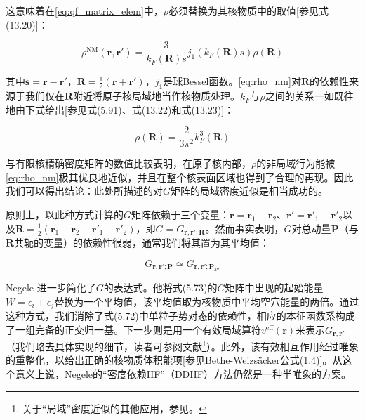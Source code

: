 这意味着在\ref{eq:qf_matrix_elem}中，$\rho$必须替换为其核物质中的取值{[}参见式(13.20){]}：

\begin{equation}
\rho^{\mathrm{NM}}(\boldsymbol{r},\boldsymbol{r}')=\frac{3}{k_{F}(\boldsymbol{R})s}j_{1}(k_{F}(\boldsymbol{R})s)\rho(\boldsymbol{R})\label{eq:rho_nm}
\end{equation}

其中$\boldsymbol{s}=\boldsymbol{r}-\boldsymbol{r}'$，$\boldsymbol{R}=\frac{1}{2}(\boldsymbol{r}+\boldsymbol{r}')$，$j_{1}$是球Bessel函数。\ref{eq:rho_nm}对$\boldsymbol{R}$的依赖性来源于我们仅在$\boldsymbol{R}$附近将原子核局域地当作核物质处理。$k_{F}$与$\rho$之间的关系一如既往地由下式给出{[}参见式(5.91)、式(13.22)和式(13.23){]}：

\begin{equation}
\rho(\boldsymbol{R})=\frac{2}{3\pi^{2}}k^{3}_{F}(\boldsymbol{R})\label{eq:rho_kf_rel}
\end{equation}

与有限核精确密度矩阵的数值比较表明\cite{Ne75}，在原子核内部，$\rho$的非局域行为能被\ref{eq:rho_nm}极其优良地近似，并且在整个核表面区域也得到了合理的再现。因此我们可以得出结论：此处所描述的对$G$矩阵的局域密度近似是相当成功的。

原则上，以此种方式计算的$G$矩阵依赖于三个变量：$\boldsymbol{r}=\boldsymbol{r}_{1}-\boldsymbol{r}_{2}$、$\boldsymbol{r}'=\boldsymbol{r}'_{1}-\boldsymbol{r}'_{2}$以及$\boldsymbol{R}=\frac{1}{2}(\boldsymbol{r}_{1}+\boldsymbol{r}_{2}-\boldsymbol{r}'_{1}-\boldsymbol{r}'_{2})$，即$G=G_{\boldsymbol{r},\boldsymbol{r}';\boldsymbol{R}}$。然而事实表明，$G$对总动量$\boldsymbol{P}$（与$\boldsymbol{R}$共轭的变量）的依赖性很弱，通常我们将其置为其平均值\cite{BGW58}：

\[
G_{\boldsymbol{r},\boldsymbol{r}';\boldsymbol{P}}\simeq G_{\boldsymbol{r},\boldsymbol{r}';\boldsymbol{P}_{\mathrm{av}}}
\]

Negele \cite{Ne70}进一步简化了$G$的表达式。他将式(5.73)的$G$矩阵中出现的起始能量$W=\epsilon_{i}+\epsilon_{j}$替换为一个平均值，该平均值取为核物质中平均空穴能量的两倍。通过这种方式，我们消除了式(5.72)中单粒子势对态的依赖性，相应的本征函数系构成了一组完备的正交归一基。下一步则是用一个有效局域算符$v^{\mathrm{eff}}(\boldsymbol{r})$来表示$G_{\boldsymbol{r},\boldsymbol{r}'}$（我们略去具体实现的细节，读者可参阅文献\cite{Ne70}\footnote{关于“局域”密度近似的其他应用，参见\cite{Ko65,NV70,CS72,NR72}。}）。此外，该有效相互作用经过唯象的重整化，以给出正确的核物质体积能项{[}参见Bethe-Weizsäcker公式(1.4){]}。从这个意义上说，Negele的“密度依赖HF”（DDHF）方法仍然是一种半唯象的方案。

